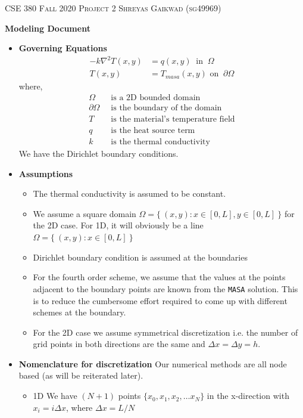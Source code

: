\documentclass[12 pt, final]{article}
\begin{document}

\noindent\textsc{
CSE 380 Fall 2020
\hfill
Project 2
\hfill
Shreyas Gaikwad (sg49969)}

\begin{center}
\Large{\textbf{Modeling Document}}
\end{center}

\begin{itemize}
    \item \textbf{Governing Equations}
        \begin{align}
            -k\nabla^2 T(x,y) &= q(x,y) \:\text{ in }\: \Omega \label{eq1}\\
            T(x,y) &= T_{masa} (x,y) \text{ on }\: \partial\Omega \nonumber 
        \end{align}
        where,
        \begin{align*}
            \Omega &\:\text{ is a 2D bounded domain}\\
            \partial\Omega &\:\text{ is the boundary of the domain}\\
            T &\:\text{ is the material's temperature field}\\
            q &\:\text{ is the heat source term}\\
            k &\:\text{ is the thermal conductivity}
        \end{align*}
        We have the Dirichlet boundary conditions.
        
    \item \textbf{Assumptions}
        \begin{itemize}
            \item The thermal conductivity is assumed to be constant.
            \item We assume a square domain $\Omega = \{\:(x,y) : x \in [0,L], y \in [0,L]\:\}$ for the 2D case. For 1D, it will obviously be a line $\Omega = \{\:(x,y) : x \in [0,L]\:\}$
            \item Dirichlet boundary condition is assumed at the boundaries
            \item For the fourth order scheme, we assume that the values at the points adjacent to the boundary points are known from the \texttt{MASA} solution. This is to reduce the cumbersome effort required to come up with different schemes at the boundary.
            \item For the 2D case we assume symmetrical discretization i.e. the number of grid points in both directions are the same and $\Delta x = \Delta y = h$.
        \end{itemize}
    \item \textbf{Nomenclature for discretization}
    Our numerical methods are all node based (as will be reiterated later).
        \begin{itemize}
            \item 1D We have $(N+1)$ points $\{x_0,x_1,x_2,\hdots x_N\}$ in the x-direction with $x_i=i\Delta x$, where $\Delta x = L/N$
                

\end{itemize}
\end{itemize}
\end{document}

